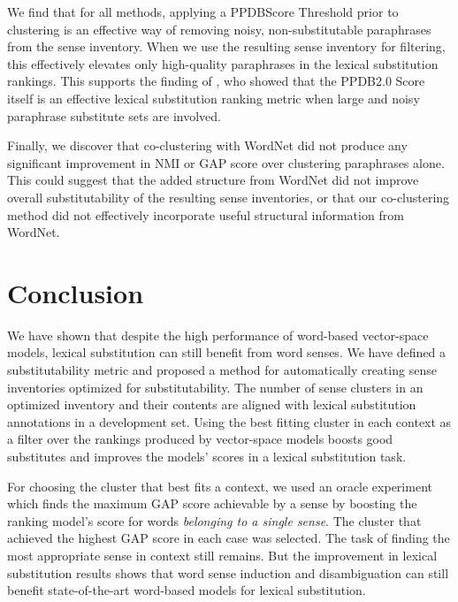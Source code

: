 \documentclass[11pt]{article}
\begin{document}
We find that for all methods, applying a PPDBScore Threshold prior to clustering is an effective way of removing noisy, non-substitutable paraphrases from the sense inventory. When we use the resulting sense inventory for filtering, this effectively elevates only high-quality paraphrases in the lexical substitution rankings. This supports the finding of , who showed that the PPDB2.0 Score itself is an effective lexical substitution ranking metric when large and noisy paraphrase substitute sets are involved.

Finally, we discover that co-clustering with WordNet did not produce any significant improvement in NMI or GAP score over clustering paraphrases alone. This could suggest that the added structure from WordNet did not improve overall substitutability of the resulting sense inventories, or that our co-clustering method did not effectively incorporate useful structural information from WordNet.


\section{Conclusion}

We have shown that despite the high performance of word-based vector-space models, lexical substitution can still benefit from word senses. We have defined a substitutability metric and proposed a method for automatically creating sense inventories optimized for substitutability. The number of sense clusters in an optimized inventory and their contents are aligned with lexical substitution annotations in a development set. Using the best fitting cluster in each context as a filter over the rankings produced by vector-space models boosts good substitutes and improves the models' scores in a lexical substitution task. 

For choosing the cluster that best fits a context, we used an oracle experiment which finds the maximum GAP score achievable by a sense by boosting the ranking model's score for words \textit{belonging to a single sense}. The cluster that achieved the highest GAP score in each case was selected. The task of finding the most appropriate sense in context still remains. But the improvement in lexical substitution results shows that word sense induction and disambiguation can still benefit state-of-the-art word-based models for lexical substitution. 
\end{document}

